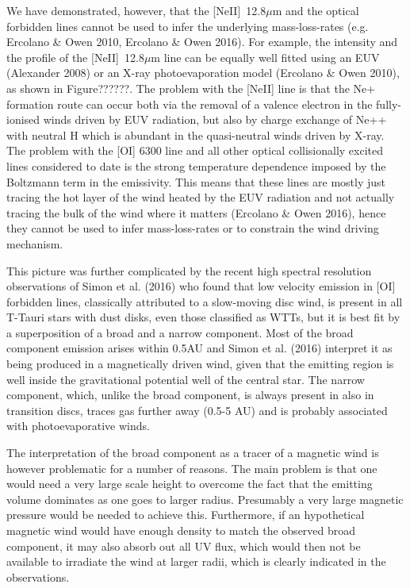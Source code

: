 \documentclass[10pt,fleqn,twoside]{article}
\begin{document}
We have demonstrated, however, that the  [NeII]~12.8$\mu$m and the
optical forbidden lines 
cannot be used to infer the underlying 
mass-loss-rates (e.g. Ercolano \& Owen 2010, Ercolano \& Owen 2016). 
 For example, the intensity and the profile of the [NeII]~12.8$\mu$m line
 can be equally well fitted using an EUV (Alexander 2008) or an X-ray
 photoevaporation model (Ercolano \& Owen 2010), as shown in
 Figure??????. The problem with the 
 [NeII] line is that the Ne+ formation route can occur both via the
 removal of a valence electron in the fully-ionised winds driven by
 EUV radiation, but also by charge exchange of Ne++ with neutral H
 which is abundant in the quasi-neutral winds driven by X-ray. 
The problem with the [OI] 6300 line and all other optical collisionally
excited lines considered to date is the strong temperature dependence
imposed by the Boltzmann term in the emissivity. This means that these
lines are mostly just tracing the hot layer of the wind heated by the
EUV radiation and not actually tracing the bulk of the wind where it
matters (Ercolano \& Owen 2016), hence they
cannot be used to infer mass-loss-rates or to constrain the wind
driving mechanism.   

This picture was further complicated by the recent high spectral
resolution observations of  Simon et al. (2016)  who found that low velocity
emission in [OI] forbidden lines, classically attributed to a
slow-moving disc wind, is present in all T-Tauri stars with
dust disks, even those classified as WTTs, but it is best fit
by a superposition of a broad and a narrow component. 
Most of the broad component emission
arises within 0.5AU and Simon et al. (2016) interpret it
as being produced in a magnetically driven wind, given that the
emitting region is well inside the gravitational 
potential well 
of the central star. The narrow component, which, unlike the broad
component, is always present in also in transition
discs, traces gas further away (0.5-5 AU) and is probably associated
with photoevaporative winds.

The interpretation of the broad component as a tracer of a magnetic
wind is however problematic for a number of reasons. The main problem
is that one would need a very large scale height to overcome the fact
that the emitting volume dominates as one goes to larger
radius. Presumably a very large magnetic pressure would be needed to
achieve this. Furthermore, if an hypothetical magnetic wind would
have enough density to match the observed broad component, it may also absorb
out all UV flux, which would then not be available to irradiate the
wind at larger radii, which is clearly indicated in the
observations. 
\end{document}
